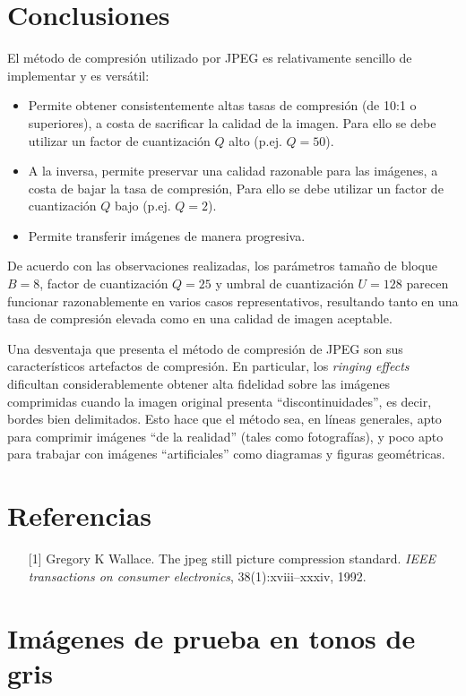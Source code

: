 \documentclass{article}
\begin{document}
\section{Conclusiones}

El método de compresión utilizado por JPEG es relativamente sencillo de implementar
y es versátil:
\begin{itemize}
\item Permite obtener consistentemente altas tasas de compresión (de 10:1 o superiores),
      a costa de sacrificar la calidad de la imagen.
      Para ello se debe utilizar un factor de cuantización $Q$ alto (p.ej. $Q = 50$).
\item A la inversa, permite preservar una calidad razonable para las imágenes,
      a costa de bajar la tasa de compresión,
      Para ello se debe utilizar un factor de cuantización $Q$ bajo (p.ej. $Q = 2$).
\item Permite transferir imágenes de manera progresiva.
\end{itemize}
De acuerdo con las observaciones realizadas,
los parámetros tamaño de bloque $B = 8$,
factor de cuantización $Q = 25$
y umbral de cuantización $U = 128$
parecen funcionar razonablemente en varios casos representativos,
resultando tanto en una tasa de compresión elevada
como en una calidad de imagen aceptable.

Una desventaja que presenta el método de compresión de JPEG son sus
característicos artefactos de compresión.
En particular, los {\em ringing effects}
dificultan considerablemente obtener alta fidelidad sobre las
imágenes comprimidas cuando la imagen original presenta ``discontinuidades'',
es decir, bordes bien delimitados.
Esto hace que el método sea, en líneas generales,
apto para comprimir imágenes ``de la realidad'' (tales como fotografías),
y poco apto para trabajar con imágenes ``artificiales'' como diagramas
y figuras geométricas.

\section*{Referencias}

\begin{itemize}
\item[{[1]}]
Gregory K Wallace.
The jpeg still picture compression standard.
{\em IEEE transactions on consumer electronics}, 38(1):xviii--xxxiv, 1992.
\end{itemize}

\newpage
\appendix
\section{Imágenes de prueba en tonos de gris}
\end{document}
